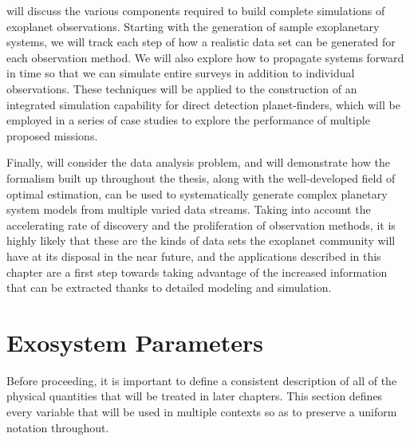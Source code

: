  will discuss the various components required to build complete simulations of exoplanet observations.  Starting with the generation of sample exoplanetary systems, we will track each step of how a realistic data set can be generated for each observation method.  We will also explore how to propagate systems forward in time so that we can simulate entire surveys in addition to individual observations.  These techniques will be applied to the construction of an integrated simulation capability for direct detection planet-finders, which will be employed in a series of case studies to explore the performance of multiple proposed missions.

Finally,  will consider the data analysis problem, and will demonstrate how the formalism built up throughout the thesis, along with the well-developed field of optimal estimation, can be used to systematically generate complex planetary system models from multiple varied data streams.  Taking into account the accelerating rate of discovery and the proliferation of observation methods, it is highly likely that these are the kinds of data sets the exoplanet community will have at its disposal in the near future, and the applications described in this chapter are a first step towards taking advantage of the increased information that can be extracted thanks to detailed modeling and simulation.

\section{Exosystem Parameters}\label{sec:exosystem_params}

Before proceeding, it is important to define a consistent description of all of the physical quantities that will be treated in later chapters.  This section defines every variable that will be used in multiple contexts so as to preserve a uniform notation throughout.

